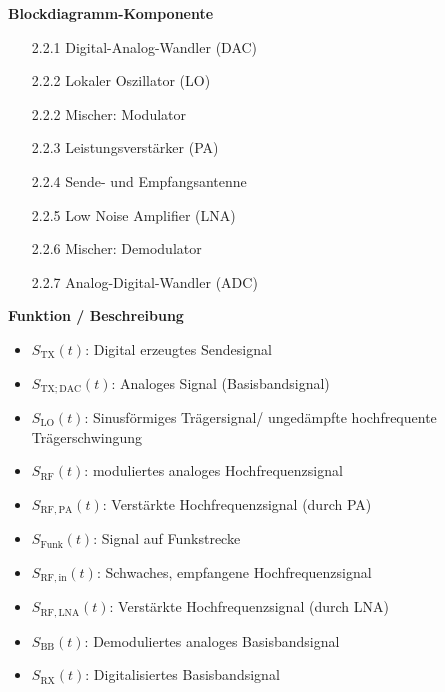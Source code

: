 \begin{minipage}{0.48\textwidth}
    \raggedright
    \textbf{\large Blockdiagramm-Komponente}\\[2ex]
    \begin{enumerate}
        \item [2.2.1] Digital-Analog-Wandler (DAC)
        \item [2.2.2] Lokaler Oszillator (LO)
        \item [2.2.2] Mischer: Modulator
        \item [2.2.3] Leistungsverstärker (PA)
        \item [2.2.4] Sende- und Empfangsantenne
        \item [2.2.5] Low Noise Amplifier (LNA)
        \item [2.2.6] Mischer: Demodulator
        \item [2.2.7] Analog-Digital-Wandler (ADC)
        
    \end{enumerate}
\end{minipage}%
\hfill
\begin{minipage}{0.48\textwidth}
    \raggedright
    \textbf{\large Funktion / Beschreibung}\\[2ex]
    \begin{itemize}
        \item $S_{\mathrm{TX}}(t)$: Digital erzeugtes Sendesignal
        \item $S_{\mathrm{TX;DAC}}(t)$: Analoges Signal (Basisbandsignal)
        \item $S_{\mathrm{LO}}(t)$: Sinusförmiges Trägersignal/ ungedämpfte hochfrequente Trägerschwingung
        \item $S_{\mathrm{RF}}(t)$: moduliertes analoges Hochfrequenzsignal
        \item $S_{\mathrm{RF,PA}}(t)$: Verstärkte Hochfrequenzsignal (durch PA)
        \item $S_{\mathrm{Funk}}(t)$: Signal auf Funkstrecke
        \item $S_{\mathrm{RF,in}}(t)$: Schwaches, empfangene Hochfrequenzsignal
        \item $S_{\mathrm{RF,LNA}}(t)$: Verstärkte Hochfrequenzsignal (durch LNA)
        \item $S_{\mathrm{BB}}(t)$: Demoduliertes analoges Basisbandsignal
        \item $S_{\mathrm{RX}}(t)$: Digitalisiertes Basisbandsignal
    \end{itemize}
\end{minipage}



